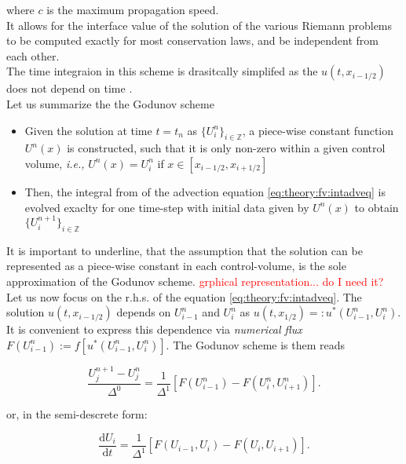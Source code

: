 \documentclass[11pt,a4paper,headinclude=true,DIV=14,BCOR=8mm,chapterprefix,listof=totoc,twoside,openright,abstracton]{scrbook}
\begin{document}
where $c$ is the maximum propagation speed. \\
It allows for the interface value of the solution of the various Riemann problems to be computed exactly for most conservation laws, and be independent from each other. \\

The time integraion in this scheme is drasitcally simplifed as the $u(t, x_{i-1/2})$ does not depend on time \cite{LeVeque:1992}. \\

Let us summarize the the Godunov scheme

\begin{itemize}
    \item Given the solution at time $t= t_n$ as $\{U_i ^n\}_{i\in\mathbb{Z}}$, a piece-wise constant function $U^n(x)$ is constructed, such that it is only non-zero within a given control volume, \textit{i.e.,} $U^n(x) = U_i ^n$ if $x\in[x_{i-1/2}, x_{i+1/2}]$
    \item Then, the integral from of the advection equation \ref{eq:theory:fv:intadveq} is evolved exaclty for one time-step with initial data given by $U^n(x)$ to obtain $\{U^{n+1}_i\}_{i\in\mathbb{Z}}$ 
\end{itemize}

It is important to underline, that the assumption that the solution can be represented as a piece-wise constant in each control-volume, is the sole approximation of the Godunov scheme. \textcolor{red}{grphical representation... do I need it?} \\

Let us now focus on the r.h.s. of the equation \ref{eq:theory:fv:intadveq}. The solution $u(t, x_{i-1/2})$ depends on $U_{i-1} ^n$ and $U_{i} ^n$ as $u(t, x_{1/2}) =: u^* (U_{i-1}^{n}, U_{i}^n)$. It is convenient to express this dependence via \textit{numerical flux} $F(U_{i-1}^{n}):=f[u^*(U_{i-1}^{n}, U_{i}^{n})]$. The Godunov scheme is them reads

\begin{equation}
    \frac{U_{j}^{n+1} - U_{j}^{n}}{\Delta^0} = \frac{1}{\Delta^1}[F(U_{i-1}^{n}) - F(U_{i}^{n}, U_{i+1}^{n})].
    \label{eq:theory:fv:discrete}
\end{equation}

or, in the semi-descrete form:

\begin{equation}
    \frac{\text{d}U_i}{\text{d} t} = \frac{1}{\Delta^1}[F(U_{i-1}, U_{i}) - F(U_i, U_{i+1})].
    \label{eq:theory:fv:semi-discrete}
\end{equation}
\end{document}
